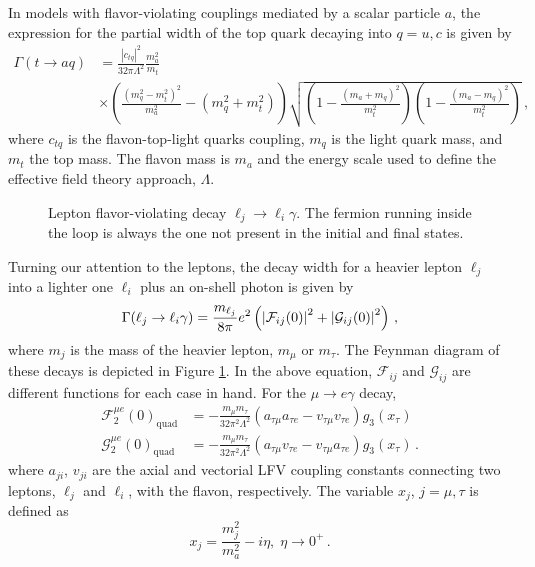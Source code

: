 \documentclass[prd,amsfonts,onecolumn,superscriptaddress,aps,nofootinbib,11pt]{revtex4-1}
\begin{document}
In models with flavor-violating couplings mediated by a scalar particle $a$, the expression for the partial width of the top quark decaying into $q = u, c$ is given by \cite{Carmona:2022jid}
\begin{equation}\label{eq:top-decay}
    \begin{split}
       \Gamma(t \to a q) &=  \frac{|c_{tq}|^2}{32\pi \Lambda^2} \frac{m_a^2}{m_t} \\
 &\times \left(  \frac{(m_q^2 - m_t^2)^2}{m_a^2} - (m_q^2 + m_t^2) \right) \sqrt{\left( 1- \frac{(m_a + m_q)^2}{m_t^2} \right) \left( 1- \frac{(m_a - m_q)^2}{m_t^2} \right)} \,,
    \end{split}
\end{equation}
where $c_{tq}$ is the flavon-top-light quarks coupling, $m_q$ is the light quark mass, and $m_t$ the top mass. The  flavon mass is $m_a$ and the energy scale used to define the effective field theory approach, $\Lambda$. %

\begin{figure}
    \centering
    
    \caption{Lepton flavor-violating decay $\ell_j \to \ell_i \gamma$. The fermion running inside the loop is always the one not present in the initial and final states.}
    \label{fig:lep-decay}
\end{figure}

Turning our attention to the leptons, the decay width for a heavier lepton $\ell_j$ into a lighter one $\ell_i$ plus an on-shell photon is given by \cite{Cornella:2019uxs}
\begin{equation}\label{eq:lfv-decay}
    \Gamma (\ell_j \to \ell_i \gamma) = \frac{m_{\ell_j}}{8 \pi} e^2 \left( \abs{\mathcal{F}_{ij}(0)}^2 + \abs{\mathcal{G}_{ij}(0)}^2 \right) \,,
\end{equation}
where $m_j$ is the mass of the heavier lepton, $m_\mu$ or $m_\tau$. The Feynman diagram of these decays is depicted in Figure \ref{fig:lep-decay}. In the above equation, $\mathcal{F}_{ij}$ and $\mathcal{G}_{ij}$ are different functions for each case in hand. For the $\mu \to e \gamma$ decay,
\begin{equation}\label{eq:FandGemu}
    \begin{split}
        \mathcal{F}^{\mu e}_2(0)_{\text{quad}} &= -\frac{m_\mu m_\tau}{32 \pi^2 \Lambda^2} (a_{\tau \mu} a_{\tau e}  - v_{\tau \mu} v_{\tau e} ) g_3(x_\tau) \\
        \mathcal{G}^{\mu e}_2(0)_{\text{quad}} &= -\frac{m_\mu m_\tau}{32 \pi^2 \Lambda^2} (a_{\tau \mu} v_{\tau e}  - v_{\tau \mu} a_{\tau e}) g_3(x_\tau) \,.
    \end{split}
\end{equation}
where $a_{ji}$, $v_{ji}$ are the axial and vectorial LFV coupling constants connecting two leptons, $\ell_j$ and $\ell_i$, with the flavon, respectively. The variable $x_j$, $j=\mu, \tau$ is defined as
\begin{equation}
    x_j = \frac{m_j^2}{m_a^2}-i\eta,\; \eta\to 0^+ \,.
\end{equation}
\end{document}
